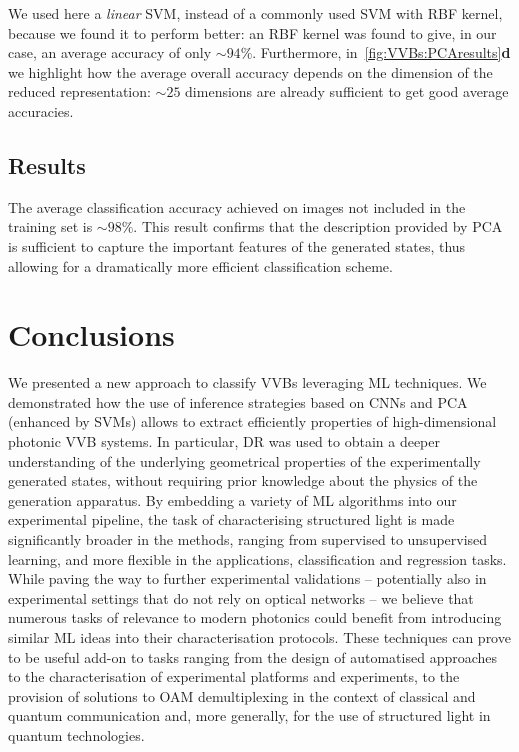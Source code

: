 We used here a \emph{linear} SVM, instead of a commonly used SVM with RBF kernel, because we found it to perform better: an RBF kernel was found to give, in our case, an average accuracy of only $\sim94\%$.
Furthermore, in~\cref{fig:VVBs:PCAresults}\textbf{d} we highlight how the average overall accuracy depends on the dimension of the reduced representation: $\sim 25$ dimensions are already sufficient to get good average accuracies.

\subsection{Results}

The average classification accuracy achieved on images not included in the training set is $\sim 98 \%$. This result confirms that the description provided by \ac{PCA} is sufficient to capture the important features of the generated states, thus allowing for a dramatically more efficient classification scheme.


\section{Conclusions}
\label{sec:VVBs:conclusions}

We presented a new approach to classify \acp{VVB} leveraging ML techniques. We demonstrated how the use of inference strategies based on CNNs and PCA (enhanced by SVMs) allows to extract efficiently properties of high-dimensional photonic \ac{VVB} systems.
In particular, DR was used to obtain a deeper understanding of the underlying geometrical properties of the experimentally generated states, without requiring prior knowledge about the physics of the generation apparatus.
By embedding a variety of {\ac{ML}} algorithms into our experimental pipeline, the task of characterising structured light is made significantly broader in the methods, ranging from supervised to unsupervised learning, and more flexible in the applications, classification and regression tasks.
%
% 
While paving the way to further experimental validations -- potentially also in experimental settings that do not rely on optical networks -- we believe that numerous tasks of relevance to modern photonics could benefit from introducing similar {\ac{ML}} ideas into their characterisation protocols. These techniques can prove to be useful add-on to tasks ranging from the design of automatised approaches to the characterisation of experimental platforms and experiments, to the provision of solutions to OAM demultiplexing in the context of classical and quantum communication and, more generally, for the use of structured light in quantum technologies.

